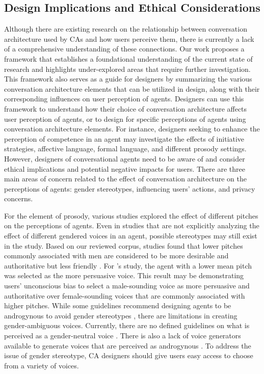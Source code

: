 \subsection{Design Implications and Ethical Considerations}

Although there are existing research on the relationship between conversation architecture used by CAs and how users perceive them, there is currently a lack of a comprehensive understanding of these connections. Our work proposes a framework that establishes a foundational understanding of the current state of research and highlights under-explored areas that require further investigation. This framework also serves as a guide for designers by summarizing the various conversation architecture elements that can be utilized in design, along with their corresponding influences on user perception of agents. Designers can use this framework to understand how their choice of conversation architecture affects user perception of agents, or to design for specific perceptions of agents using conversation architecture elements. For instance, designers seeking to enhance the perception of competence in an agent may investigate the effects of initiative strategies, affective language, formal language, and different prosody settings. However, designers of conversational agents need to be aware of and consider ethical implications and potential negative impacts for users. There are three main areas of concern related to the effect of conversation architecture on the perceptions of agents: gender stereotypes, influencing users' actions, and privacy concerns.

For the element of prosody, various studies explored the effect of different pitches on the perceptions of agents. Even in studies that are not explicitly analyzing the effect of different gendered voices in an agent, possible stereotypes may still exist in the study. Based on our reviewed corpus, studies found that lower pitches commonly associated with men are considered to be more desirable and authoritative but less friendly \cite{jestin2022effects, tolmeijer2021female}\cmt{[81][62]}. For \citet{dubiel2020persuasive}\cmt{[60]}'s study, the agent with a lower mean pitch was selected as the more persuasive voice. This result may be demonstrating users' unconscious bias to select a male-sounding voice as more persuasive and authoritative over female-sounding voices that are commonly associated with higher pitches. While some guidelines recommend designing agents to be androgynous to avoid gender stereotypes \cite{ruane2019conversational}, there are limitations in creating gender-ambiguous voices. Currently, there are no defined guidelines on what is perceived as a gender-neutral voice \cite{jestin2022effects}\cmt{[81]}. There is also a lack of voice generators available to generate voices that are perceived as androgynous \cite{tolmeijer2021female}\cmt{[62]}. To address the issue of gender stereotype, CA designers should give users easy access to choose from a variety of voices.

